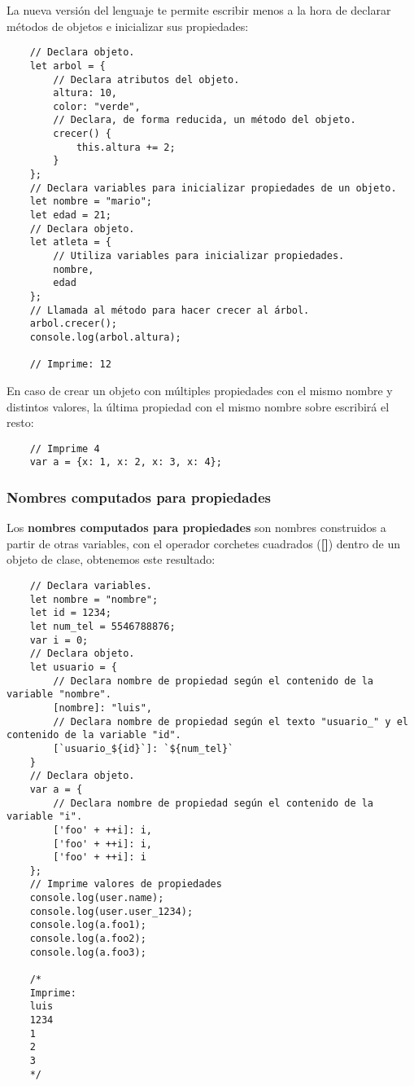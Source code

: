 La nueva versión del lenguaje te permite escribir menos a la hora de declarar métodos de objetos e inicializar sus propiedades:
\begin{lstlisting}
    // Declara objeto.
    let arbol = {
        // Declara atributos del objeto.
        altura: 10,
        color: "verde",
        // Declara, de forma reducida, un método del objeto.
        crecer() {
            this.altura += 2;
        }
    };
    // Declara variables para inicializar propiedades de un objeto.
    let nombre = "mario";
    let edad = 21;
    // Declara objeto.
    let atleta = {
        // Utiliza variables para inicializar propiedades.
        nombre,
        edad
    };
    // Llamada al método para hacer crecer al árbol.
    arbol.crecer();
    console.log(arbol.altura);

    // Imprime: 12
\end{lstlisting}

En caso de crear un objeto con múltiples propiedades con el mismo nombre y distintos valores, la última propiedad con el mismo nombre sobre escribirá el resto:
\begin{lstlisting}
    // Imprime 4
    var a = {x: 1, x: 2, x: 3, x: 4};
\end{lstlisting} 


\subsubsection{Nombres computados para propiedades}

Los \textbf{nombres computados para propiedades} son nombres construidos a partir de otras variables, con el operador corchetes cuadrados (\textbf{[]}) dentro de un objeto de clase, obtenemos este resultado:
\begin{lstlisting}
    // Declara variables.
    let nombre = "nombre";
    let id = 1234;
    let num_tel = 5546788876;
    var i = 0;
    // Declara objeto.
    let usuario = {
        // Declara nombre de propiedad según el contenido de la variable "nombre".
        [nombre]: "luis",
        // Declara nombre de propiedad según el texto "usuario_" y el contenido de la variable "id".
        [`usuario_${id}`]: `${num_tel}`
    }
    // Declara objeto.
    var a = {
        // Declara nombre de propiedad según el contenido de la variable "i".
        ['foo' + ++i]: i,
        ['foo' + ++i]: i,
        ['foo' + ++i]: i
    };
    // Imprime valores de propiedades
    console.log(user.name);
    console.log(user.user_1234);
    console.log(a.foo1);
    console.log(a.foo2);
    console.log(a.foo3);

    /*
    Imprime:
    luis
    1234
    1
    2
    3
    */
\end{lstlisting}


